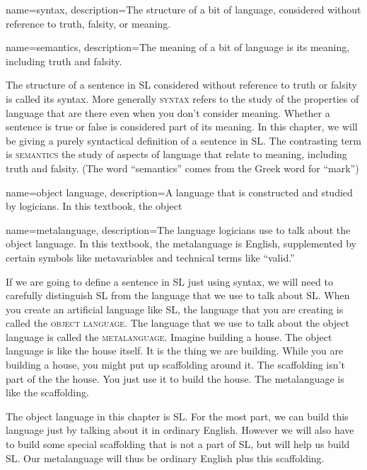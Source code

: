 {
name=syntax,
description={The structure of a bit of language, considered without reference to truth, falsity, or meaning.}
}

{
name=semantics,
description={The meaning of a bit of language is its meaning, including truth and falsity.}
}

The structure of a sentence in SL considered without reference to truth or falsity is called its syntax. More generally \textsc{\gls{syntax}} \label{def:syntax} refers to the study of the properties of language that are there even when you don't consider meaning. Whether a sentence is true or false is considered part of its meaning. In this chapter, we will be giving a purely syntactical definition of a sentence in SL.  The contrasting term is \textsc{\gls{semantics}} \label{def:semantics} the study of aspects of language that relate to meaning, including truth and falsity. (The word ``semantics'' comes from the Greek word for ``mark'')

{
name=object language,
description={A language that is constructed and studied by logicians. In this textbook, the object }
}


{
name=metalanguage,
description={The language logicians use to talk about the object language. In this textbook, the metalanguage is English, supplemented by certain symbols like metavariables and technical terms like ``valid.''}
}

If we are going to define a sentence in SL just using syntax, we will need to carefully distinguish SL from the language that we use to talk about SL. When you create an artificial language like SL, the language that you are creating is called the \textsc{\gls{object language}}. \label{def:object_language} The language that we use to talk about the object language is called the \textsc{\gls{metalanguage}}. \label{def:metalanguage} Imagine building a house. The object language is like the house itself. It is the thing we are building. While you are building a house, you might put up scaffolding around it. The scaffolding isn't part of the the house. You just use it to build the house. The metalanguage is like the scaffolding. 

The object language in this chapter is SL. For the most part, we can build this language just by talking about it in ordinary English. However we will also have to build some special scaffolding that is not a part of SL, but will help us build SL. Our metalanguage will thus be ordinary English plus this scaffolding.

